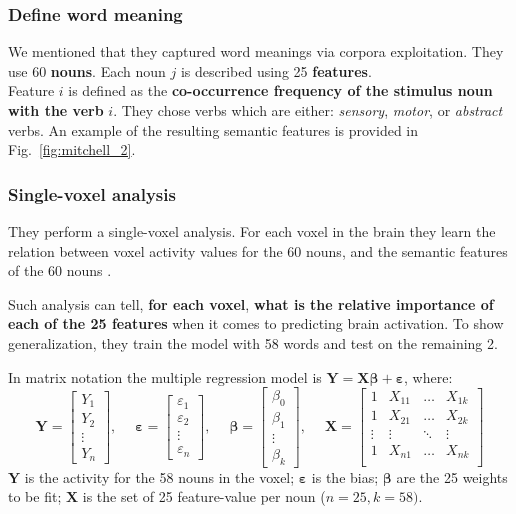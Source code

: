 \subsubsection{Define word meaning}
We mentioned that they captured word meanings via corpora exploitation. They use 60 \textbf{nouns}. Each noun $j$ is described using 25 \textbf{features}.\\
Feature $i$ is defined as the \textbf{co-occurrence frequency of the stimulus noun with the verb} $i$. They chose verbs which are either: \textit{sensory}, \textit{motor}, or \textit{abstract} verbs. An example of the resulting semantic features is provided in Fig.~\ref{fig:mitchell_2}.

\subsubsection{Single-voxel analysis}
They perform a single-voxel analysis. For each voxel in the brain they learn the relation between voxel activity values for the 60 nouns, and the semantic features of the 60 nouns \notet.

Such analysis can tell, \textbf{for each voxel},\textbf{ what is the relative importance of each of the 25 features} when it comes to predicting brain activation. To show generalization, they train the model with 58 words and test on the remaining 2.

In matrix notation the multiple regression model is $\mathbf{Y=X}\boldsymbol{\beta}+\boldsymbol{\varepsilon}$, where:
\[ 
     \mathbf{Y} = \begin{bmatrix}
     Y_1 \\ Y_2 \\ \vdots \\ Y_n
     \end{bmatrix}, \quad\; 
     \boldsymbol{\varepsilon} = \begin{bmatrix}
     \varepsilon_1 \\ \varepsilon_2 \\ \vdots \\ \varepsilon_n
     \end{bmatrix}, \quad\;
     \boldsymbol{\beta} = \begin{bmatrix}
     \beta_0 \\ \beta_1 \\ \vdots \\ \beta_k
     \end{bmatrix}, \quad\;
     \mathbf{X} = \begin{bmatrix}
     1 & X_{11} & \dots & X_{1k}\\
     1 & X_{21} & \dots & X_{2k}\\
     \vdots & \vdots & \ddots & \vdots\\
     1 & X_{n1} & \dots & X_{nk}\\
     \end{bmatrix}
\] 
$\mathbf{Y}$ is the activity for the 58 nouns in the voxel; $\boldsymbol{\varepsilon}$ is the bias; $\boldsymbol{\beta}$ are the 25 weights to be fit; $\mathbf{X}$ is the set of 25 feature-value per noun ($n=25, k=58)$.

